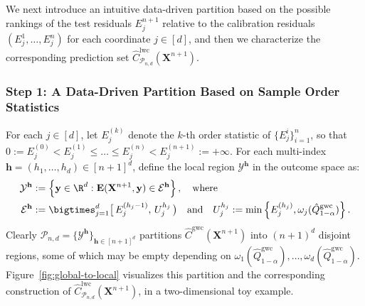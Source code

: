 We next introduce an intuitive data-driven partition based on the possible rankings of the test residuals $E_j^{n+1}$ relative to the calibration residuals $(E_j^{1},\ldots,E_j^{n})$ for each coordinate $j \in [d]$, and then we characterize the corresponding prediction set $\hat{C}^{\mathrm{lwc}}_{\mathcal{P}_{n,d}}(\mathbf{X}^{n+1})$.

\subsubsection{Step 1: A Data-Driven Partition Based on Sample Order Statistics}


For each $j \in [d]$, let $E^{(k)}_j$ denote the $k$-th order statistic of $\{{E}^i_j\}_{i=1}^n$, so that $0 := E^{(0)}_j < E^{(1)}_j \leq \ldots \leq E^{(n)}_j < E^{(n+1)}_j := +\infty$. 
For each multi-index $\mathbf{h}=(h_1,\ldots,h_d)\in [n+1]^d$, define the local region $\mathcal{Y}^{\mathbf{h}}$ in the outcome space as:
\begin{equation}\label{eq:rectangle-explicit}
    \begin{aligned}
        \mathcal{Y}^{\mathbf{h}} &:= \left\{\mathbf y \in \R^d: \mathbf E(\mathbf{X}^{n+1}, \mathbf y) \in \mathcal{E}^{\mathbf{h}}\right\}, \quad \text{where}\\
        \mathcal{E}^{\mathbf{h}} &:=  \bigtimes_{j=1}^d \bigl[\,E^{(h_j-1)}_j,\, U^{h_j}_j\,\bigr) \quad\text{and} \quad U^{h_j}_j := \min\left\{E^{(h_j)}_j,  \omega_j(\hat{Q}^{\mathrm{gwc}}_{1-\alpha})\right\}
        .
    \end{aligned}
\end{equation}
Clearly $ \mathcal{P}_{n,d} = \{\mathcal{Y}^{\mathbf{h}}\}_{\mathbf{h}\in[n+1]^d}$ partitions $\hat{C}^\mathrm{gwc}(\mathbf{X}^{n+1})$ into $(n+1)^d$ disjoint regions, some of which may be empty depending on $\omega_1(\hat{Q}^{\mathrm{gwc}}_{1-\alpha}),\ldots,\omega_d(\hat{Q}^{\mathrm{gwc}}_{1-\alpha})$.
Figure~\ref{fig:global-to-local} visualizes this partition and the corresponding construction of $\hat{C}^{\mathrm{lwc}}_{\mathcal{P}_{n,d}}(\mathbf{X}^{n+1})$, in a two-dimensional toy example.

